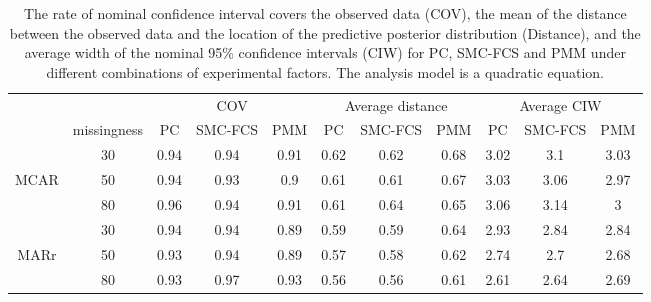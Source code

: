 	\begin{table}
		\begin{tabular}{cc|ccc|ccc|ccc}
			\multicolumn{2}{l}{}                    & \multicolumn{3}{c|}{COV} & \multicolumn{3}{c|}{Average distance} & \multicolumn{3}{c}{Average CIW} \\ \cline{2-11} 
			\multicolumn{1}{c|}{}     & missingness & PC    & SMC-FCS  & PMM   & PC         & SMC-FCS      & PMM       & PC       & SMC-FCS    & PMM     \\
			\multicolumn{1}{c|}{}     & 30          & 0.94  & 0.94     & 0.91  & 0.62       & 0.62         & 0.68      & 3.02     & 3.1        & 3.03    \\
			\multicolumn{1}{c|}{MCAR} & 50          & 0.94  & 0.93     & 0.9   & 0.61       & 0.61         & 0.67      & 3.03     & 3.06       & 2.97    \\
			\multicolumn{1}{c|}{}     & 80          & 0.96  & 0.94     & 0.91  & 0.61       & 0.64         & 0.65      & 3.06     & 3.14       & 3       \\ \hline
			\multicolumn{1}{c|}{}     & 30          & 0.94  & 0.94     & 0.89  & 0.59       & 0.59         & 0.64      & 2.93     & 2.84       & 2.84    \\
			\multicolumn{1}{c|}{MARr} & 50          & 0.93  & 0.94     & 0.89  & 0.57       & 0.58         & 0.62      & 2.74     & 2.7        & 2.68    \\
			\multicolumn{1}{c|}{}     & 80          & 0.93  & 0.97     & 0.93  & 0.56       & 0.56         & 0.61      & 2.61     & 2.64       & 2.69   
		\end{tabular}
		\caption{The rate of nominal confidence interval covers the observed data (COV), the mean of the distance between the observed data and the location of the predictive posterior distribution (Distance), and the average width of the nominal 95\% confidence intervals (CIW) for PC, SMC-FCS and PMM under different combinations of experimental factors. The analysis model is a quadratic equation.}
		\label{tab6_2}
	\end{table}
	
